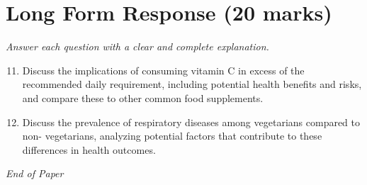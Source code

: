 \documentclass[12pt]{article}
\begin{document}
\section*{Long Form Response (20 marks)}
\textit{Answer each question with a clear and complete explanation.}
\begin{enumerate}[label=\arabic*.]
\setcounter{enumi}{10}
\item Discuss the implications of consuming vitamin C in excess of the recommended daily requirement, including potential health benefits and risks, and compare these to other common food supplements.
\item Discuss the prevalence of respiratory diseases among vegetarians compared to non- vegetarians, analyzing potential factors that contribute to these differences in health outcomes.
\end{enumerate}

\vfill
\noindent\textit{End of Paper}
\end{document}
